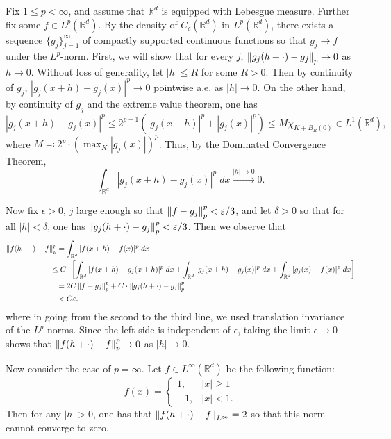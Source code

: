 \documentclass{article}
\begin{document}
Fix $1\leq p < \infty$, and assume that $\mathbb{R}^{d}$ is equipped with Lebesgue measure. Further fix some $f \in L^{p}(\mathbb{R}^{d})$. By the density of $C_{c}(\mathbb{R}^{d})$ in $L^{p}(\mathbb{R}^{d})$, there exists a sequence $\{g_{j}\}_{j = 1}^{\infty}$ of compactly supported continuous functions so that $g_{j} \to f$ under the $L^{p}$-norm. First, we will show that for every $j$, $\left\Vert g_{j}(h + \cdot) - g_{j} \right\Vert_{p} \to 0$ as $h \to 0$. Without loss of generality, let $|h| \leq R$ for some $R > 0$. Then by continuity of $g_{j}$, $|g_{j}(x + h) - g_{j}(x)|^{p} \to 0$ pointwise a.e. as $|h| \to 0$. On the other hand, by continuity of $g_{j}$ and the extreme value theorem, one has 
\begin{equation*}
	|g_{j}(x + h) - g_{j}(x)|^{p} \leq 2^{p-1}(|g_{j}(x + h)|^{p} + |g_{j}(x)|^{p}) \leq M\chi_{K + B_{R}(0)} \in L^{1}(\mathbb{R}^{d}),
\end{equation*}
where $M \eqqcolon 2^{p} \cdot (\max_{K}|g_{j}(x)|)^{p}$. Thus, by the Dominated Convergence Theorem, 
\begin{equation*}
	\int_{\mathbb{R}^{d}}|g_{j}(x + h) - g_{j}(x)|^{p}\;dx \xrightarrow{|h| \to 0} 0. 
\end{equation*}


Now fix $\epsilon > 0$, $j$ large enough so that $\left\Vert f - g_{j} \right\Vert_{p}^{p} < \varepsilon/3$, and let $\delta > 0$ so that for all $|h| < \delta$, one has $\left\Vert g_{j}(h + \cdot) - g_{j} \right\Vert_{p}^{p} < \varepsilon/3$. Then we observe that 
\begin{align*}
	\begin{split}
		\norm{f(h + \cdot) - f}_{p}^{p} &= \int_{\mathbb{R}^{d}}|f(x + h) - f(x)|^{p}\;dx \\
		&\hspace{-0.3cm}\leq C\cdot \left[\int_{\mathbb{R}^{d}}|f(x + h) - g_{j}(x + h)|^{p}\;dx + \int_{\mathbb{R}^{d}}|g_{j}(x + h) - g_{j}(x)|^{p}\;dx+ \int_{\mathbb{R}^{d}}|g_{j}(x) - f(x)|^{p}\;dx\right] \\
		&= 2C\norm{f - g_{j}}_{p}^{p} + C \cdot \norm{g_{j}(h + \cdot) - g_{j}}_{p}^{p} \\
		&< C\epsilon. 
	\end{split}
\end{align*}
where in going from the second to the third line, we used translation invariance of the $L^{p}$ norms. Since the left side is independent of $\epsilon$, taking the limit $\epsilon \to 0$ shows that $\left\Vert f(h + \cdot) - f \right\Vert_{p}^{p} \to 0$ as $|h| \to 0$. 

Now consider the case of $p = \infty$. Let $f \in L^{\infty}(\mathbb{R}^{d})$ be the following function: 
\begin{equation*}
	f(x) = 
	\begin{cases}
		1, & |x| \geq 1 \\
		-1, & |x| < 1. 
	\end{cases}
\end{equation*}
Then for any $|h| > 0$, one has that $\left\Vert f(h + \cdot) - f \right\Vert_{L^\infty} = 2$ so that this norm cannot converge to zero. 
\end{document}
